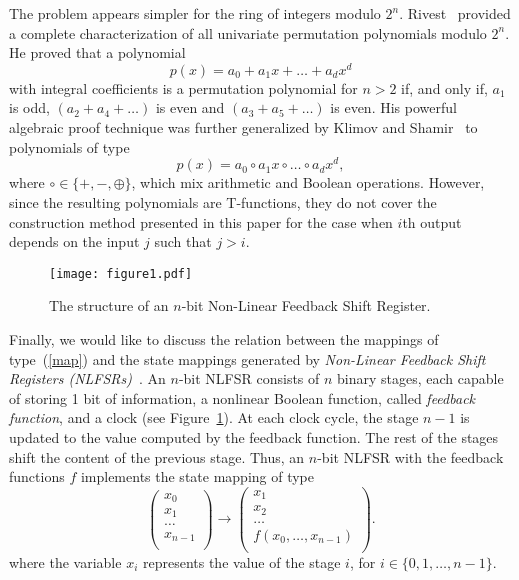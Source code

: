 \documentclass[9pt,conference]{IEEEtran} \usepackage{times}
\begin{document}
The problem appears simpler for the ring of integers modulo $2^n$. Rivest~\cite{Ri99} provided a complete characterization of all univariate permutation polynomials modulo $2^n$. He proved that a polynomial 
\[
p(x) = a_0 + a_1 x + \ldots + a_d x^d
\]
with integral coefficients is a permutation polynomial for $n > 2$ if, and only if, $a_1$ is odd, $(a_2 + a_4 + \ldots)$ is even and $(a_3 + a_5 + \ldots)$ is even. 
His powerful algebraic proof technique was further generalized by Klimov and Shamir~\cite{KlS02,Kl05} to polynomials of type 
\[
p(x) = a_0 \circ a_1 x \circ \ldots \circ a_d x^d,
\]
where $\circ  \in \{+,-,\oplus\}$, which mix arithmetic and Boolean operations. However, since the resulting polynomials are T-functions, they do not cover the construction method presented in this paper for the case when $i$th output depends on the input $j$ such that $j > i$.

\begin{figure}[t!]
\begin{center}
\texttt{[image: figure1.pdf]}
\caption{The structure of an $n$-bit Non-Linear Feedback Shift Register.}\label{f1} 
\end{center}
\end{figure}

Finally, we would like to discuss the relation between the mappings of type~(\ref{map}) and
the state mappings generated by {\em Non-Linear Feedback Shift Registers (NLFSRs)}~\cite{Ja89}.
An $n$-bit NLFSR consists of $n$ binary stages, each capable of storing 1 bit of information, a nonlinear Boolean function, called {\em feedback function}, and a clock (see Figure~\ref{f1}). 
At each clock cycle, the  stage $n-1$ is updated to the value computed by the feedback function. The rest of the stages shift the content of the previous stage. Thus, an $n$-bit NLFSR with the feedback functions $f$ implements the state mapping of type 
\[
\left(
\begin{array}{c}
x_0\\
x_1\\
\ldots \\
x_{n-1}\\
\end{array}
\right)
\rightarrow
\left(
\begin{array}{cc}
x_1\\
x_2\\
\ldots \\
f(x_0,\ldots,x_{n-1})\\
\end{array}
\right).
\]
where the variable $x_i$ represents the value of the stage $i$, for $i \in \{0,1,\ldots,n-1\}$.
\end{document}
